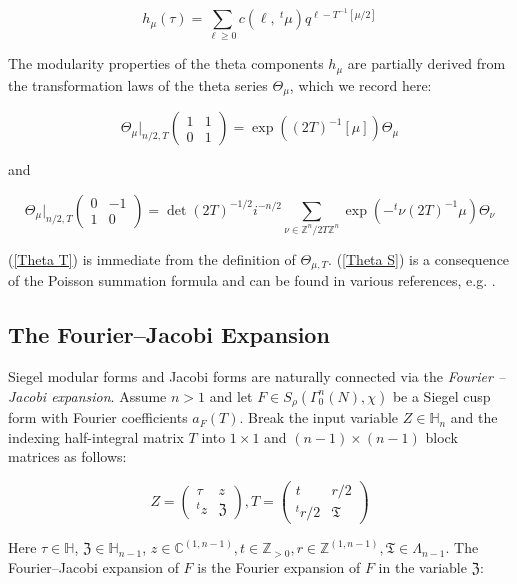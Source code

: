 \documentclass[11pt]{article}
\theoremstyle{definition}
\theoremstyle{remark}
\newcommand{\C}{\mathbb{C}}
\newcommand{\Z}{\mathbb{Z}}
\newcommand{\h}{\mathbb{H}}
\begin{document}
\[
h_\mu(\tau) = \sum_{\ell \geq 0} c\left(\ell, \ ^t\mu \right)q^{\ell - T^{-1}[\mu/2]}
\]

The modularity properties of the theta components $h_\mu$ are partially derived from the transformation laws of the theta series $\Theta_\mu$, which we record here:

\begin{equation}
    \Theta_\mu \vert_{n/2,T} \begin{pmatrix}
        1 & 1 \\ 0 & 1
    \end{pmatrix} = \exp((2T)^{-1}[\mu])\Theta_\mu \label{Theta T}
\end{equation} 

and

\begin{equation}
        \Theta_\mu \vert_{n/2,T} \begin{pmatrix}
        0 & -1 \\ 1 & 0 
    \end{pmatrix} = \det(2T)^{-1/2} i^{-n/2} \sum_{\nu \in \Z^n/2T\Z^n} \exp(-^t\nu(2T)^{-1}\mu) \Theta_\nu \label{Theta S}
\end{equation} 

(\ref{Theta T}) is immediate from the definition of $\Theta_{\mu,T}$. (\ref{Theta S}) is a consequence of the Poisson summation formula and can be found in various references, e.g. \cite{ziegler}.

\subsection{The Fourier--Jacobi Expansion}

Siegel modular forms and Jacobi forms are naturally connected via the \textit{Fourier -- Jacobi expansion}. Assume $n > 1$ and let $F \in S_\rho(\Gamma_0^n(N),\chi)$ be a Siegel cusp form with Fourier coefficients $a_F(T)$. Break the input variable $Z \in \h_n$ and the indexing half-integral matrix $T$ into $1\times 1$ and $(n-1) \times (n-1)$ block matrices as follows:

\[
Z = \begin{pmatrix}
    \tau & z \\ ^tz & \mathfrak{Z}
\end{pmatrix}, T = \begin{pmatrix}
    t & r/2 \\ ^tr/2 & \mathfrak{T}
\end{pmatrix}
\]

Here $\tau \in \h$, $\mathfrak{Z} \in \h_{n-1}$, $z \in \C^{(1,n-1)}, t \in \Z_{>0}, r\in \mathbb{Z}^{(1,n-1)},\mathfrak{T}\in \Lambda_{n-1}$. The Fourier--Jacobi expansion of $F$ is the Fourier expansion of $F$ in the variable $\mathfrak{Z}$:
\end{document}
